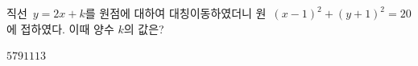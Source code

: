 직선~$y=2x+k$를 원점에 대하여 대칭이동하였더니 원~$(x-1)^2+(y+1)^2=20$에 접하였다. 이때 양수 $k$의 값은?
\begin{choices32}{$5$}{$7$}{$9$}{$11$}{$13$}\end{choices32}
